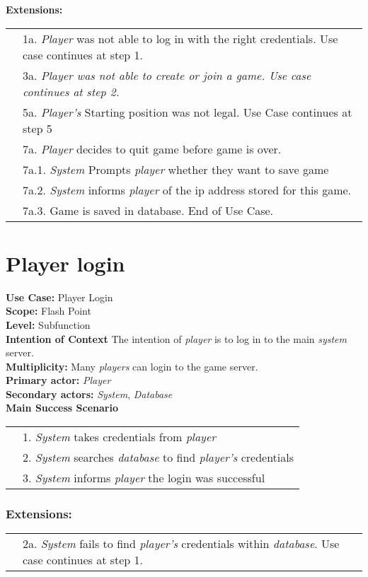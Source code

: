 \documentclass{article}
\begin{document}
	\textbf{Extensions:}\\
	\begin{tabular}{l l}
		&1a. \textit{Player} was not able to log in with the right credentials. Use case continues at step 1.\\
		&3a. \textit{Player was not able to create or join a game. Use case continues at step 2.}\\
		&5a. \textit{Player's} Starting position was not legal. Use Case continues at step 5\\
		&7a. \textit{Player} decides to quit game before game is over.\\
		&\qquad 7a.1. \textit{System} Prompts \textit{player} whether they want to save game\\
		&\qquad 7a.2. \textit{System} informs \textit{player} of the ip address stored for this game.\\
		&\qquad 7a.3. Game is saved in database. End of Use Case.
	\end{tabular}
	\section*{Player login}
	\textbf{Use Case:} Player Login\\
	\textbf{Scope:}
	Flash Point\\
	\textbf{Level:}
	Subfunction\\
	\textbf{Intention of Context}
	The intention of \textit{player} is to log in to the main \textit{system} server.\\
	\textbf{Multiplicity:}
	Many \textit{players} can login to the game server.\\
	\textbf{Primary actor: } \textit{Player}\\
	\textbf{Secondary actors:} \textit{System}, \textit{Database}\\
	\textbf{Main Success Scenario}\\
	\begin{tabular}{l l}
		&1. \textit{System} takes credentials from \textit{player}\\
		&2. \textit{System} searches \textit{database} to find \textit{player's} credentials\\
		&3. \textit{System} informs \textit{player} the login was successful
	\end{tabular}
	\subsubsection*{Extensions:}
	\begin{tabular}{l l}
		&2a. \textit{System} fails to find \textit{player's} credentials within \textit{database}. Use case continues at step 1.
	\end{tabular}
\end{document}
